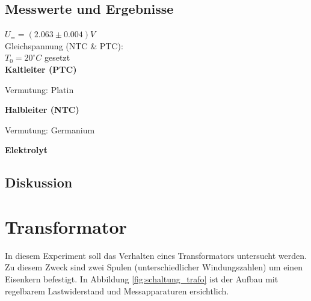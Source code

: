 \documentclass[12pt,a4paper]{article}
\begin{document}
\begin{multicols}{2}

\subsection{Messwerte und Ergebnisse}
$U_{=} = (2.063 \pm 0.004)V$\\
\indent Gleichspannung (NTC \& PTC):\\
$T_0 = 20^\circ C$ gesetzt\\






\noindent \textbf{Kaltleiter (PTC)}


Vermutung: Platin

\noindent \textbf{Halbleiter (NTC)}

Vermutung: Germanium

\noindent \textbf{Elektrolyt}



\subsection{Diskussion}





\section{Transformator}
In diesem Experiment soll das Verhalten eines Transformators untersucht werden. Zu diesem Zweck sind zwei Spulen (unterschiedlicher Windungszahlen) um einen Eisenkern befestigt. In Abbildung \ref{fig:schaltung_trafo} ist der Aufbau mit regelbarem Lastwiderstand und Messapparaturen ersichtlich.


\end{multicols}
\end{document}
